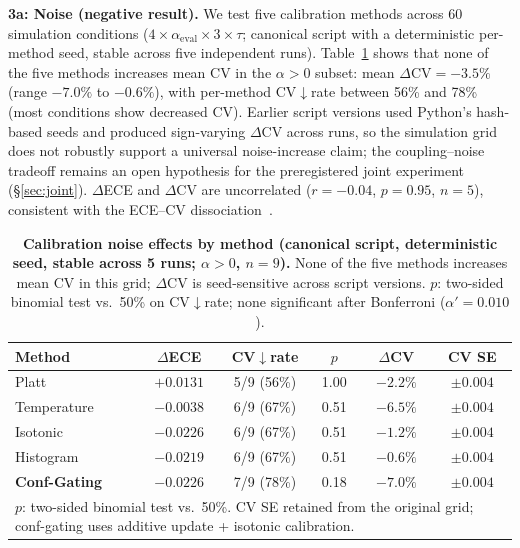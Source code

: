 \documentclass[11pt]{article}
\newcommand{\CV}{\ensuremath{\mathrm{CV}}}
\theoremstyle{definition}
\theoremstyle{remark}
\begin{document}
\textbf{3a: Noise (negative result).} We test five calibration methods across 60 simulation conditions ($4 \times \alpha_{\text{eval}} \times 3 \times \tau$; canonical script with a deterministic per-method seed, stable across five independent runs). Table~\ref{tab:noise} shows that none of the five methods increases mean CV in the $\alpha{>}0$ subset: mean $\Delta\CV = -3.5\%$ (range $-7.0\%$ to $-0.6\%$), with per-method CV$\downarrow$rate between 56\% and 78\% (most conditions show decreased CV). Earlier script versions used Python's hash-based seeds and produced sign-varying $\Delta\CV$ across runs, so the simulation grid does not robustly support a universal noise-increase claim; the coupling--noise tradeoff remains an open hypothesis for the preregistered joint experiment (\S\ref{sec:joint}). $\Delta$ECE and $\Delta$CV are uncorrelated ($r = -0.04$, $p = 0.95$, $n{=}5$), consistent with the ECE--CV dissociation~\citep{tian2023calibration}.

\begin{table}[H]
\centering
\caption{\textbf{Calibration noise effects by method (canonical script, deterministic seed, stable across 5 runs; $\alpha{>}0$, $n{=}9$).} None of the five methods increases mean CV in this grid; $\Delta\CV$ is seed-sensitive across script versions. $p$: two-sided binomial test vs.\ 50\% on CV$\downarrow$rate; none significant after Bonferroni ($\alpha' = 0.010$).}
\label{tab:noise}
\begin{tabular}{@{}lccccc@{}}
\toprule
Method & $\Delta$ECE & CV$\downarrow$rate & $p$ & $\Delta$CV & CV SE \\
\midrule
Platt & $+0.0131$ & 5/9 (56\%) & 1.00 & $-2.2\%$ & $\pm 0.004$ \\
Temperature & $-0.0038$ & 6/9 (67\%) & 0.51 & $-6.5\%$ & $\pm 0.004$ \\
Isotonic & $-0.0226$ & 6/9 (67\%) & 0.51 & $-1.2\%$ & $\pm 0.004$ \\
Histogram & $-0.0219$ & 6/9 (67\%) & 0.51 & $-0.6\%$ & $\pm 0.004$ \\
\midrule
\textbf{Conf-Gating} & $\mathbf{-0.0226}$ & 7/9 (78\%) & 0.18 & $\mathbf{-7.0\%}$ & $\pm 0.004$ \\
\bottomrule
\multicolumn{6}{l}{\footnotesize $p$: two-sided binomial test vs.\ 50\%. CV SE retained from the original grid; conf-gating uses additive update + isotonic calibration.} \\
\end{tabular}
\end{table}
\end{document}
